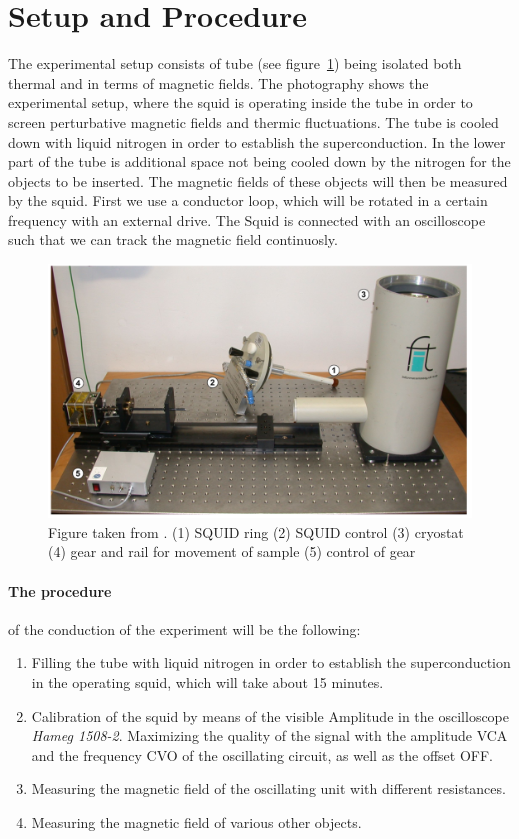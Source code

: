 \section{Setup and Procedure}
The experimental setup consists of tube (see figure~\ref{fig:setup1}) being
isolated both thermal and in terms of magnetic fields. 
The photography shows the experimental setup, where the squid is operating inside the tube in order
    to screen perturbative magnetic fields and thermic fluctuations. The tube is cooled down
    with liquid nitrogen in order to establish the superconduction. In the lower part of the
    tube is additional space not being cooled down by the nitrogen for the objects to be inserted.
    The magnetic fields of these objects will then be measured by the squid.
First we use a conductor loop, which will be rotated in a certain frequency with
an external drive. The Squid is connected with an oscilloscope such that 
we can track the magnetic field continuosly.
\begin{figure}[htpb]
    \centering
    \includegraphics[width=0.8\linewidth]{figures/setup_fig}
    \caption{Figure taken from \cite{ver}. (1) SQUID ring (2) SQUID control (3) cryostat (4) gear and 
    rail for movement of sample (5) control of gear}
    \label{fig:setup1}
\end{figure}
\paragraph{The procedure} of the conduction of the experiment will be
the following:
\begin{enumerate}
\item Filling the tube with liquid nitrogen in order to establish the superconduction in the
operating squid, which will take about 15 minutes.
\item Calibration of the squid by means of the visible Amplitude in the oscilloscope \textit{Hameg 1508-2}.
Maximizing the quality of the signal with the amplitude VCA and the frequency CVO of the oscillating circuit, as
well as the offset OFF.
\item Measuring the magnetic field of the oscillating unit with different resistances.
\item Measuring the magnetic field of various other objects.
\end{enumerate}


